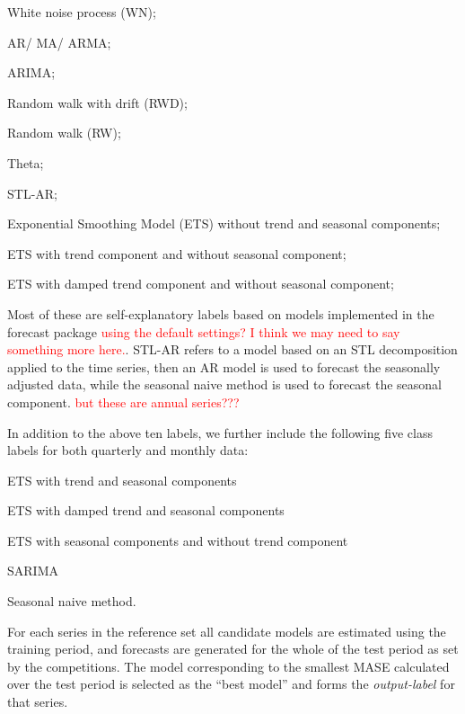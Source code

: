 \documentclass[11pt,a4paper,]{article}
\theoremstyle{definition}
\theoremstyle{definition}
\theoremstyle{definition}
\theoremstyle{remark}
\begin{document}
\begin{compactenum}[\hspace*{1cm}(a)]
  \item White noise process (WN);
  \item AR/ MA/ ARMA;
  \item ARIMA;
  \item Random walk with drift (RWD);
  \item Random walk (RW);
  \item Theta;
  \item STL-AR;
  \item Exponential Smoothing Model (ETS) without trend and seasonal components;
  \item ETS with trend component and without seasonal component;
  \item ETS with damped trend component and without seasonal component;
  \end{compactenum}

Most of these are self-explanatory labels based on models implemented in
the forecast package \autocite{forecast}
\textcolor{red}{using the default settings? I think we may need to say something more here.}.
STL-AR refers to a model based on an STL decomposition applied to the
time series, then an AR model is used to forecast the seasonally
adjusted data, while the seasonal naive method is used to forecast the
seasonal component. \textcolor{red}{but these are annual series???}

In addition to the above ten labels, we further include the following
five class labels for both quarterly and monthly data:

\begin{compactenum}[\hspace*{1cm}(a)]\setcounter{enumi}{10}
  \item ETS with trend and seasonal components
  \item ETS with damped trend and seasonal components
  \item ETS with seasonal components and without trend component
  \item SARIMA
  \item Seasonal naive method.
  \end{compactenum}

For each series in the reference set all candidate models are estimated
using the training period, and forecasts are generated for the whole of
the test period as set by the competitions. The model corresponding to
the smallest MASE \autocite{hyndman2006another} calculated over the test
period is selected as the ``best model'' and forms the
\emph{output-label} for that series.
\end{document}
